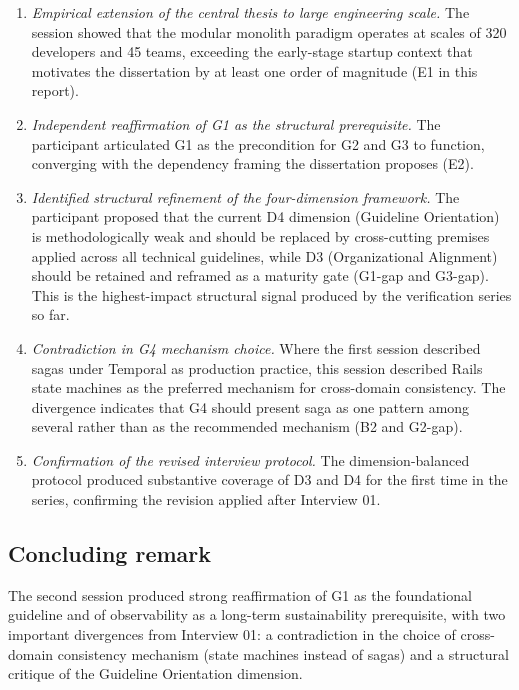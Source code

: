 \begin{enumerate}[itemsep=3pt,topsep=2pt]
  \item \emph{Empirical extension of the central thesis to large engineering scale.} The session showed that the modular monolith paradigm operates at scales of 320 developers and 45 teams, exceeding the early-stage startup context that motivates the dissertation by at least one order of magnitude (E1 in this report).
  \item \emph{Independent reaffirmation of G1 as the structural prerequisite.} The participant articulated G1 as the precondition for G2 and G3 to function, converging with the dependency framing the dissertation proposes (E2).
  \item \emph{Identified structural refinement of the four-dimension framework.} The participant proposed that the current D4 dimension (Guideline Orientation) is methodologically weak and should be replaced by cross-cutting premises applied across all technical guidelines, while D3 (Organizational Alignment) should be retained and reframed as a maturity gate (G1-gap and G3-gap). This is the highest-impact structural signal produced by the verification series so far.
  \item \emph{Contradiction in G4 mechanism choice.} Where the first session described sagas under Temporal as production practice, this session described Rails state machines as the preferred mechanism for cross-domain consistency. The divergence indicates that G4 should present saga as one pattern among several rather than as the recommended mechanism (B2 and G2-gap).
  \item \emph{Confirmation of the revised interview protocol.} The dimension-balanced protocol produced substantive coverage of D3 and D4 for the first time in the series, confirming the revision applied after Interview 01.
\end{enumerate}

\subsection*{Concluding remark}

The second session produced strong reaffirmation of G1 as the foundational guideline and of observability as a long-term sustainability prerequisite, with two important divergences from Interview 01: a contradiction in the choice of cross-domain consistency mechanism (state machines instead of sagas) and a structural critique of the Guideline Orientation dimension.
